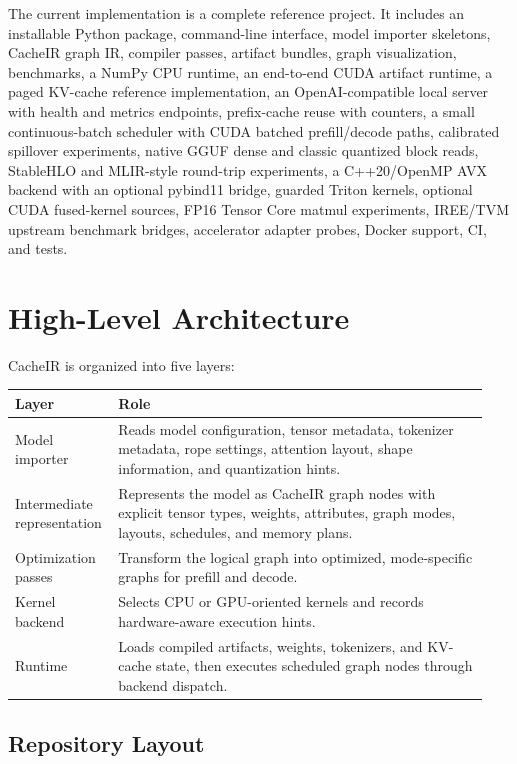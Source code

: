 \documentclass[11pt]{article}
\begin{document}
The current implementation is a complete reference project. It includes an
installable Python package, command-line interface, model importer skeletons,
CacheIR graph IR, compiler passes, artifact bundles, graph visualization,
benchmarks, a NumPy CPU runtime, an end-to-end CUDA artifact runtime, a paged
KV-cache reference implementation, an OpenAI-compatible local server with health
and metrics endpoints, prefix-cache reuse with counters, a small continuous-batch
scheduler with CUDA batched prefill/decode paths, calibrated spillover
experiments, native GGUF dense and classic
quantized block reads, StableHLO and MLIR-style round-trip experiments, a
C++20/OpenMP AVX backend with an optional pybind11 bridge, guarded Triton
kernels, optional CUDA fused-kernel sources, FP16 Tensor Core matmul experiments,
IREE/TVM upstream benchmark bridges, accelerator adapter probes, Docker support,
CI, and tests.

\section{High-Level Architecture}

CacheIR is organized into five layers:

\begin{longtable}{p{0.18\linewidth}p{0.76\linewidth}}
\toprule
\textbf{Layer} & \textbf{Role} \\
\midrule
Model importer & Reads model configuration, tensor metadata, tokenizer metadata,
rope settings, attention layout, shape information, and quantization hints. \\
Intermediate representation & Represents the model as CacheIR graph nodes with
explicit tensor types, weights, attributes, graph modes, layouts, schedules, and
memory plans. \\
Optimization passes & Transform the logical graph into optimized, mode-specific
graphs for prefill and decode. \\
Kernel backend & Selects CPU or GPU-oriented kernels and records hardware-aware
execution hints. \\
Runtime & Loads compiled artifacts, weights, tokenizers, and KV-cache state, then
executes scheduled graph nodes through backend dispatch. \\
\bottomrule
\end{longtable}

\subsection{Repository Layout}
\end{document}
